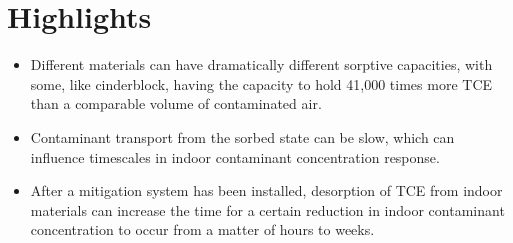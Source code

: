 \documentclass{article}
\begin{document}
\section*{Highlights}

\begin{itemize}
  \item Different materials can have dramatically different sorptive capacities, with some, like cinderblock, having the capacity to hold 41,000 times more TCE than a comparable volume of contaminated air.
  \item Contaminant transport from the sorbed state can be slow, which can influence timescales in indoor contaminant concentration response.
  \item After a mitigation system has been installed, desorption of TCE from indoor materials can increase the time for a certain reduction in indoor contaminant concentration to occur from a matter of hours to weeks.
\end{itemize}
\end{document}
